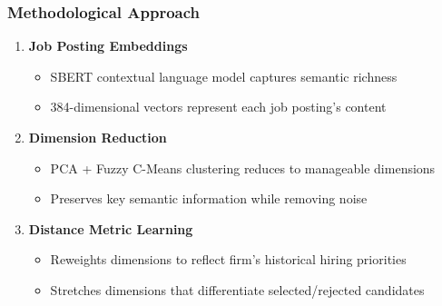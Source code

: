 \documentclass[aspectratio=169]{beamer}
\begin{document}
\begin{frame}
\frametitle{Methodological Approach}

\centering
{}
\vspace{1em}

\begin{enumerate}
\item \textbf{Job Posting Embeddings}
   \begin{itemize}
   \item SBERT contextual language model captures semantic richness
   \item 384-dimensional vectors represent each job posting's content
   \end{itemize}
\vspace{0.5em}

\item \textbf{Dimension Reduction}
   \begin{itemize}
   \item PCA + Fuzzy C-Means clustering reduces to manageable dimensions
   \item Preserves key semantic information while removing noise
   \end{itemize}
\vspace{0.5em}

\item \textbf{Distance Metric Learning}
   \begin{itemize}
   \item Reweights dimensions to reflect firm's historical hiring priorities
   \item Stretches dimensions that differentiate selected/rejected candidates
   \end{itemize}
\end{enumerate}
\end{frame}
\end{document}
